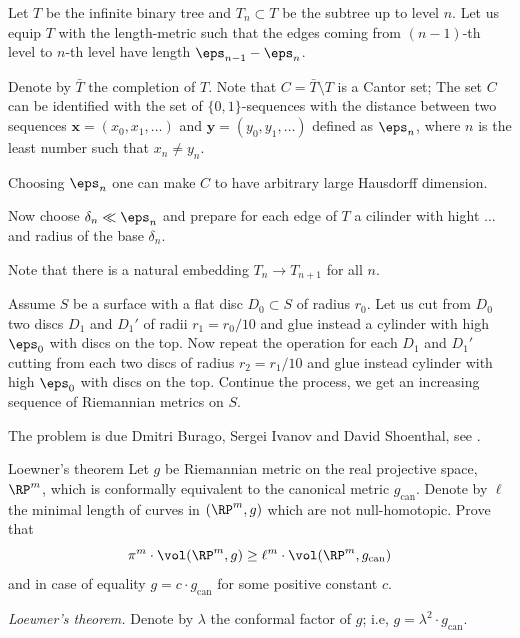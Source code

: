 Let $T$ be the infinite binary tree
and $T_n\subset T$ be the subtree up to level $n$.
Let us equip $T$ with the length-metric such that the edges coming from $(n-1)$-th level to $n$-th level have length $\eps_{n-1}-\eps_n$.

Denote by $\bar T$ the completion of $T$.
Note that $C=\bar T\setminus T$ is a Cantor set;
The set $C$ can be identified with the set of $\{0,1\}$-sequences 
with the distance between two sequences $\bm{x}=(x_0,x_1,\dots)$ and $\bm{y}=(y_0,y_1,\dots)$ defined as $\eps_n$, where $n$ is the least number such that $x_n\ne y_n$.

Choosing $\eps_n$ one can make $C$ to have arbitrary large Hausdorff dimension.

Now choose $\delta_n\ll\eps_n$ and prepare for each edge of $T$ a cilinder with hight ... and radius of the base $\delta_n$.
 

Note that there is a natural embedding $T_{n}\to T_{n+1}$ for all $n$.


Assume $S$ be a surface with a flat disc $D_0\subset S$ of radius $r_0$.
Let us cut from $D_0$ two discs $D_1$ and $D_1'$ 
of radii $r_1=r_0/10$ and glue instead a cylinder with high $\eps_0$ 
with discs on the top.
Now repeat the operation for each $D_1$ and $D_1'$ cutting 
from each two discs of radius $r_2=r_1/10$
and glue instead cylinder with high $\eps_0$ 
with discs on the top.
Continue the process, we get an increasing sequence of Riemannian metrics on $S$.

The problem is due
Dmitri Burago, 
Sergei Ivanov 
and David Shoenthal,
see \cite{BIS}.














\begin{pr}{}{Loewner's theorem}
\label{Loewner's theorem}
Let $g$ be Riemannian metric
on the real projective space, $\RP^m$,
which is
conformally equivalent to the canonical metric $g_{\text{can}}$.
Denote by $\ell$ the minimal length of curves in $(\RP^m,g)$ which are not null-homotopic. 
Prove that 
$$\pi^m\cdot\vol(\RP^m,g)
\ge 
\ell^m
\cdot
\vol(\RP^m,g_{\text{can}})$$ 
and in case of equality $g=c\cdot g_{\text{can}}$ for some positive constant $c$.
\end{pr}

\textit{Loewner's theorem.}
Denote by $\lambda$ the conformal factor of $g$;
i.e, $g=\lambda^2\cdot g_{\mathrm{can}}$.

